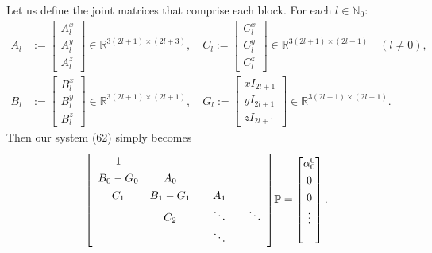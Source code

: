\documentclass[11pt, oneside]{article}   	%
\newcommand{\R}{\mathbb{R}}
\newcommand{\No}{\mathbb{N}_0}
\newcommand{\bigP}{\mathbb{P}}
\begin{document}
Let us define the joint matrices that comprise each block. For each \(l \in \No\):
\begin{align}
A_l &:= \begin{bmatrix}
		A^x_l \\
		A^y_l \\
		A^z_l
	    \end{bmatrix} \in \R^{3(2l+1)\times(2l+3)}, \quad
C_l := \begin{bmatrix}
		C^x_l \\
		C^y_l \\
		C^z_l
	    \end{bmatrix} \in \R^{3(2l+1)\times(2l-1)} \quad (l \ne 0), \\
B_l &:= \begin{bmatrix}
		B^x_l \\
		B^y_l \\
		B^z_l
	    \end{bmatrix} \in \R^{3(2l+1)\times(2l+1)}, \quad
G_l := \begin{bmatrix}
		xI_{2l+1} \\
		yI_{2l+1} \\
		zI_{2l+1}
	    \end{bmatrix} \in \R^{3(2l+1)\times(2l+1)}.
\end{align}
Then our system (62) simply becomes
\begin{align}
\renewcommand\arraystretch{1.3}
\mleft[
\begin{array}{cccc}
		1  & & & \\
		B_0-G_0 & A_0 & & \\
		C_1 & B_1-G_1 & \quad A_1 \quad & \\
		& C_2 & \ddots & \ddots \\
		& & \ddots &
\end{array}
\mright]
\bigP
=
\begin{bmatrix}
	\alpha^0_0 \\ 0 \\ 0 \\ \vdots \\ \\
\end{bmatrix}.
\end{align}
\end{document}
